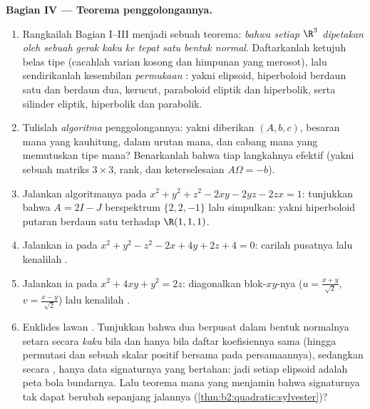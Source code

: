 \begin{problem}
\medskip
\noindent\textbf{Bagian IV --- Teorema penggolongannya.}
\begin{enumerate}[resume]
  \item Rangkailah Bagian I--III menjadi sebuah teorema: \emph{bahwa setiap
         $\R^3$ dipetakan oleh sebuah gerak kaku ke
        tepat satu bentuk normal}. Daftarkanlah ketujuh belas tipe
         (cacahlah varian kosong dan himpunan yang merosot),
        lalu sendirikanlah kesembilan \emph{permukaan} :
        yakni elipsoid, hiperboloid berdaun satu dan berdaun dua, kerucut,
        paraboloid eliptik dan hiperbolik, serta silinder eliptik,
        hiperbolik dan parabolik.
  \item Tulislah \emph{algoritma} penggolongannya: yakni diberikan $(A,
        b, c)$, besaran mana yang kauhitung, dalam urutan mana, dan
        cabang mana yang memutuskan tipe mana? Benarkanlah
        bahwa tiap langkahnya efektif (yakni  sebuah matriks
         $3\times3$, rank, dan keterselesaian
        $A\Omega = -b$).
  \item Jalankan algoritmanya pada $x^2 + y^2 + z^2 - 2xy - 2yz -
        2zx = 1$: tunjukkan bahwa $A = 2I - J$ berspektrum $\{2, 2,
        -1\}$ lalu simpulkan: yakni hiperboloid putaran berdaun satu
        terhadap $\R(1,1,1)$.
  \item Jalankan ia pada $x^2 + y^2 - z^2 - 2x + 4y + 2z + 4 = 0$:
        carilah pusatnya lalu kenalilah .
  \item Jalankan ia pada $x^2 + 4xy + y^2 = 2z$: diagonalkan
        blok-$xy$-nya ($u = \frac{x+y}{\sqrt2}$, $v =
        \frac{x-y}{\sqrt2}$) lalu kenalilah .
  \item Euklides lawan . Tunjukkan bahwa dua  berpusat
        dalam bentuk normalnya setara secara \emph{kaku}
        bila dan hanya bila daftar koefisiennya sama (hingga
        permutasi dan sebuah skalar positif bersama pada
        persamaannya), sedangkan secara \emph{}, hanya
        data signaturnya yang bertahan: jadi setiap elipsoid adalah peta 
        bola bundarnya. Lalu teorema mana yang menjamin bahwa
        signaturnya tak dapat berubah sepanjang jalannya
        (\cref{thm:b2:quadratic:sylvester})?
\end{enumerate}


\end{problem}
